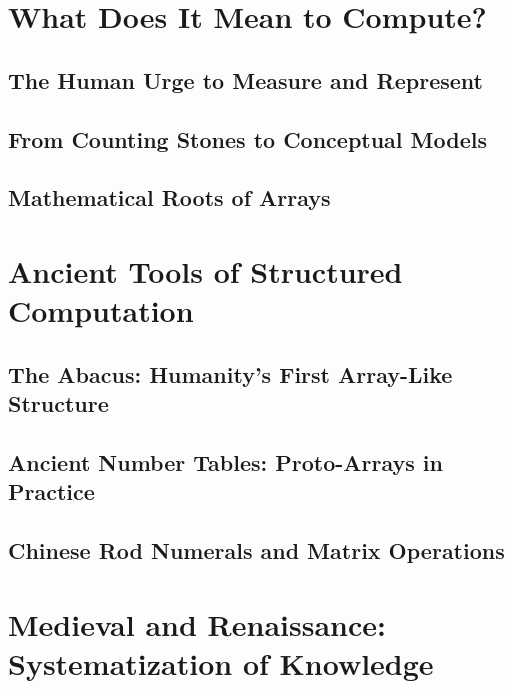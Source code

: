 \documentclass[12pt, oneside, openany]{book}
\begin{document}

\chapter{What Does It Mean to Compute?}

\section{The Human Urge to Measure and Represent}

\section{From Counting Stones to Conceptual Models}

\section{Mathematical Roots of Arrays}


\chapter{Ancient Tools of Structured Computation}

\section{The Abacus: Humanity's First Array-Like Structure}

\section{Ancient Number Tables: Proto-Arrays in Practice}

\section{Chinese Rod Numerals and Matrix Operations}


\chapter{Medieval and Renaissance: Systematization of Knowledge}
\end{document}
